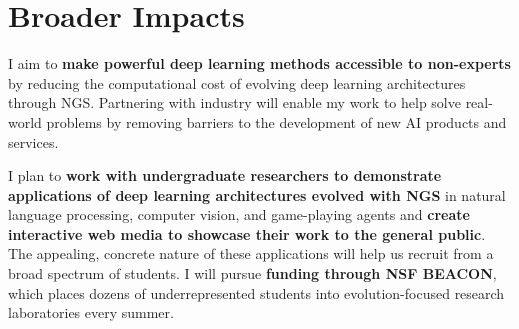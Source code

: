 \section{Broader Impacts}

I aim to \textbf{make powerful deep learning methods accessible to non-experts} by reducing the computational cost of evolving deep learning architectures through NGS.
Partnering with industry will enable my work to help solve real-world problems by removing barriers to the development of new AI products and services.

I plan to \textbf{work with undergraduate researchers to demonstrate applications of deep learning architectures evolved with NGS} in natural language processing, computer vision, and game-playing agents and \textbf{create interactive web media to showcase their work to the general public}.
The appealing, concrete nature of these applications will help us recruit from a broad spectrum of students.
I will pursue \textbf{funding through NSF BEACON}, which places dozens of underrepresented students into evolution-focused research laboratories every summer.
